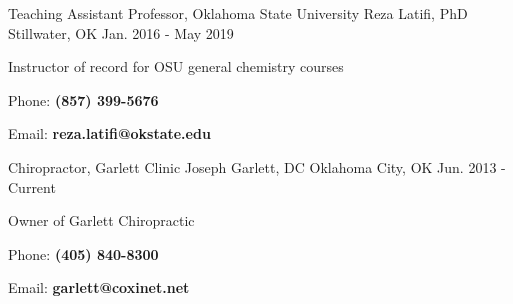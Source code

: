 

\begin{cventries}
	\vspace{5mm}

  \cventry
    {Teaching Assistant Professor, Oklahoma State University} %
    {Reza Latifi, PhD} %
    {Stillwater, OK} %
    {Jan. 2016 - May 2019} %
    {
      \begin{cvitems} %
        \item {Instructor of record for OSU general chemistry courses}
        \item{Phone: \textbf{(857) 399-5676‬}}
        \item{Email: \textbf{reza.latifi@okstate.edu}}
        \vspace{10mm}
      \end{cvitems}
    }


\cventry
{Chiropractor, Garlett Clinic} %
{Joseph Garlett, DC} %
{Oklahoma City, OK} %
{Jun. 2013 - Current} %
{
	\begin{cvitems} %
		\item {Owner of Garlett Chiropractic}
		 \item{Phone: \textbf{(405) 840-8300}}
		\item{Email: \textbf{garlett@coxinet.net}}
		\vspace{10mm}
	\end{cvitems}
}


\end{cventries}
